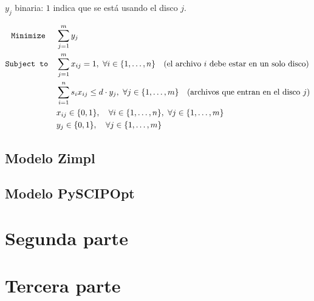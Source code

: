 \documentclass[11pt, a4paper, pdftex]{article}
\begin{document}
$y_{j}$ binaria: $1$ indica que se está usando el disco $j$.

\begin{alignat*}{2}
	\texttt{Minimize}\quad\,\,
	& \sum_{j = 1}^{m} y_{j}\\
	\texttt{Subject to}\quad
	& \sum_{j = 1}^{m} x_{ij} = 1, \ \forall i \in \{1, \ldots, n\} \quad\text{(el archivo $i$ debe estar en un solo disco)}\\
	& \sum_{i = 1}^{n} s_{i} x_{ij} \le d\cdot y_{j}, \ \forall j \in \{1, \ldots, m\} \quad\text{(archivos que entran en el disco $j$)}\\
	& x_{ij} \in \{0,1\}, \quad \forall i \in \{1, \ldots, n\}, \ \forall j \in \{1, \ldots, m\}\\
	& y_{j} \in \{0,1\}, \quad \forall j \in \{1, \ldots, m\}
\end{alignat*}

\newpage
\subsection{Modelo Zimpl}



\newpage
\subsection{Modelo PySCIPOpt}











\section{Segunda parte}

\section{Tercera parte}
\end{document}
